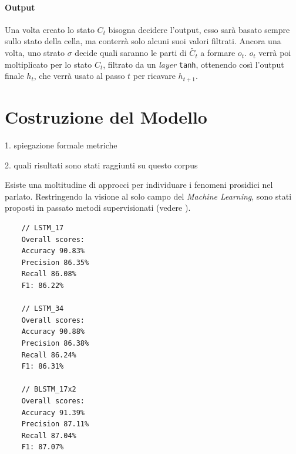 \documentclass[twoside,twocolumn,11pt]{extarticle}
\theoremstyle{definition}
\begin{document}
		\paragraph{Output}
			Una volta creato lo stato $C_t$ bisogna decidere l'output, esso sarà basato sempre sullo stato della cella, ma conterrà solo alcuni suoi valori filtrati. Ancora una volta, uno strato $\sigma$ decide quali saranno le parti di $\tilde{C_t}$ a formare $o_t$. $o_t$ verrà poi moltiplicato per lo stato $C_t$, filtrato da un \textit{layer} \texttt{tanh}, ottenendo così l'output finale $h_t$, che verrà usato al passo $t$ per ricavare $h_{t + 1}$.

\section{Costruzione del Modello}\label{sec:building}

1. spiegazione formale metriche

2. quali risultati sono stati raggiunti su questo corpus

Esiste una moltitudine di approcci per individuare i fenomeni prosidici nel parlato. Restringendo la visione al solo campo del \textit{Machine Learning}, sono stati proposti in passato metodi supervisionati (vedere \cite[Capitolo 4]{bib:fenomeni-prosodici-prominenza}).

\begin{verbatim}
	// LSTM_17
	Overall scores:
	Accuracy 90.83%
	Precision 86.35%
	Recall 86.08%
	F1: 86.22%
	
	// LSTM_34
	Overall scores:
	Accuracy 90.88%
	Precision 86.38%
	Recall 86.24%
	F1: 86.31%
	
	// BLSTM_17x2
	Overall scores:
	Accuracy 91.39%
	Precision 87.11%
	Recall 87.04%
	F1: 87.07%
\end{verbatim}

\newpage\null\pagestyle{empty}\newpage
\newpage\null\pagestyle{empty}\newpage
\newpage\null\pagestyle{empty}\newpage
\end{document}

